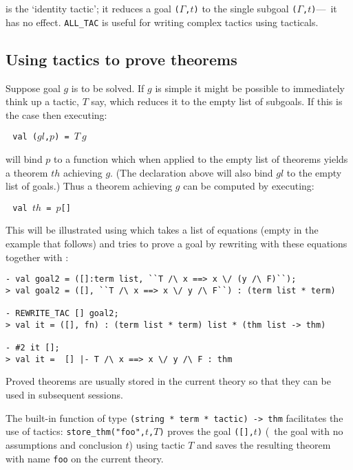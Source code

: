 \noindent is the `identity tactic'; it reduces a goal
{\small\verb|(|}$\Gamma${\small\verb|,|}$t${\small\verb|)|} to the
single subgoal
{\small\verb|(|}$\Gamma${\small\verb|,|}$t${\small\verb|)|}---\ie\ it
has no effect. {\small\verb|ALL_TAC|} is useful for writing complex
tactics using tacticals.


\subsection{Using tactics to prove theorems}
\label{using-tactics}

Suppose goal $g$ is to be solved. If $g$ is simple it might be
possible to immediately think up a tactic, $T$ say, which reduces it
to the empty list of subgoals. If this is the case then executing:

$\ ${\small\verb| val (|}$gl${\small\verb|,|}$p${\small\verb|) = |}$T\ g$

\noindent will bind $p$ to a function which when applied to the empty list
of theorems yields a theorem $th$ achieving $g$.  (The declaration
above will also bind $gl$ to the empty list of goals.) Thus a theorem
achieving $g$ can be computed by executing:

$\ ${\small\verb| val |}$th${\small\verb| = |}$p${\small\verb|[]|}

\noindent This will be illustrated using  which takes a list
of equations (empty in the example that follows) and tries to prove a goal
by rewriting with these equations together with
:

\begin{session}
\begin{verbatim}
- val goal2 = ([]:term list, ``T /\ x ==> x \/ (y /\ F)``);
> val goal2 = ([], ``T /\ x ==> x \/ y /\ F``) : (term list * term)

- REWRITE_TAC [] goal2;
> val it = ([], fn) : (term list * term) list * (thm list -> thm)

- #2 it [];
> val it =  [] |- T /\ x ==> x \/ y /\ F : thm
\end{verbatim}
\end{session}

\noindent Proved theorems are usually stored in the current theory
so that they can be used in subsequent sessions.

The built-in function
  of
\ML{} type {\small\verb|(string * term * tactic) -> thm|} facilitates the use
of tactics:
{\small\verb|store_thm("foo",|}$t${\small\verb|,|}$T${\small\verb|)|} proves
the goal   {\small\verb|([],|}$t${\small\verb|)|}   (\ie\  the   goal  with  no
assumptions and  conclusion  $t$)  using  tactic  $T$  and  saves the resulting
theorem with name {\small\verb|foo|} on the current theory.

